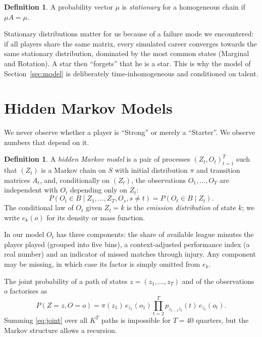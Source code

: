 \documentclass[11pt]{amsart}
\theoremstyle{definition}
\newtheorem{definition}[theorem]{Definition}
\theoremstyle{remark}
\begin{document}
\begin{definition}
A probability vector $\mu$ is \emph{stationary} for a homogeneous chain if $\mu A=\mu$.
\end{definition}

Stationary distributions matter for us because of a failure mode we encountered: if all players share the same matrix, every simulated career converges towards the same stationary distribution, dominated by the most common states (Marginal and Rotation). A star then ``forgets'' that he is a star. This is why the model of Section~\ref{sec:model} is deliberately time-inhomogeneous and conditioned on talent.

\section{Hidden Markov Models}\label{sec:hmm}

We never observe whether a player is ``Strong'' or merely a ``Starter''. We observe numbers that depend on it.

\begin{definition}\label{def:hmm}
A \emph{hidden Markov model} is a pair of processes $(Z_t,O_t)_{t=1}^T$ such that $(Z_t)$ is a Markov chain on $S$ with initial distribution $\pi$ and transition matrices $A_t$, and, conditionally on $(Z_t)$, the observations $O_1,\dots,O_T$ are independent with $O_t$ depending only on $Z_t$:
\[
P(O_t\in B\mid Z_1,\dots,Z_T, O_s, s\ne t) = P(O_t\in B\mid Z_t).
\]
The conditional law of $O_t$ given $Z_t=k$ is the \emph{emission distribution} of state $k$; we write $e_k(o)$ for its density or mass function.
\end{definition}

In our model $O_t$ has three components: the share of available league minutes the player played (grouped into five bins), a context-adjusted performance index (a real number) and an indicator of missed matches through injury. Any component may be missing, in which case its factor is simply omitted from $e_k$.

The joint probability of a path of states $z=(z_1,\dots,z_T)$ and of the observations $o$ factorises as
\begin{equation}\label{eq:joint}
P(Z=z, O=o) = \pi(z_1)\,e_{z_1}(o_1)\prod_{t=2}^{T} p_{z_{t-1}z_t}(t)\,e_{z_t}(o_t).
\end{equation}
Summing \eqref{eq:joint} over all $K^T$ paths is impossible for $T=40$ quarters, but the Markov structure allows a recursion.
\end{document}
